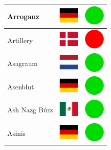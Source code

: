 \documentclass[12pt, a4paper, twoside]{report}
\begin{document}
\begin{center}
\begin{longtable}{|p{5cm}|p{2cm}|p{2cm}|}
Arroganz & \includegraphics[width=1cm]{4x3/de} & \includegraphics[width=1cm]{likes/y} \\ \hline
Artillery & \includegraphics[width=1cm]{4x3/dk} & \includegraphics[width=1cm]{likes/n} \\ \hline
Asagraum & \includegraphics[width=1cm]{4x3/nl} & \includegraphics[width=1cm]{likes/y} \\ \hline
Asenblut & \includegraphics[width=1cm]{4x3/de} & \includegraphics[width=1cm]{likes/y} \\ \hline
Ash Nazg Búrz & \includegraphics[width=1cm]{4x3/mx} & \includegraphics[width=1cm]{likes/y} \\ \hline
Asinis & \includegraphics[width=1cm]{4x3/de} & \includegraphics[width=1cm]{likes/y} \\ \hline

\end{longtable}
\end{center}
\end{document}
